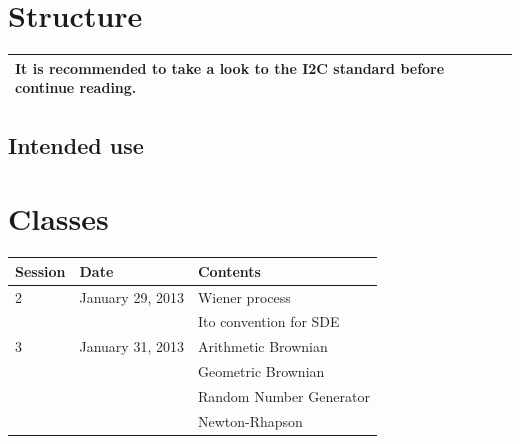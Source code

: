 \documentclass[a4paper,11pt]{article}
\begin{document}
\pagebreak

\setcounter{page}{1}
\pagebreak

\setcounter{tocdepth}{3}
\tableofcontents
\pagebreak
\listoftables
\listoffigures
\pagebreak

\setcounter{page}{1}

\pagebreak
\section{Structure}
\begin{center}
\begin{tabularx}{\textwidth}{|X|}
\hline
It is recommended to take a look to the I2C standard before continue reading.\\
\hline
\end{tabularx}
\end{center}

\pagebreak
\subsection{Intended use}

\appendix
\section{Classes}
  \begin{center}
    \begin{tabular}{|p{1.5cm}|p{4cm}|p{5.5cm}|}
      \hline
      \textbf{Session} & \textbf{Date} & \textbf{Contents}\\
      \hline
      2 & January 29, 2013  & Wiener process\\
        & & Ito convention for SDE\\
      \hline
      3 &  January 31, 2013 & Arithmetic Brownian     \\
        &                   & Geometric Brownian      \\
        &                   & Random Number Generator \\
        &                   & Newton-Rhapson          \\
      \hline
    \end{tabular}
  \end{center}
\end{document}
